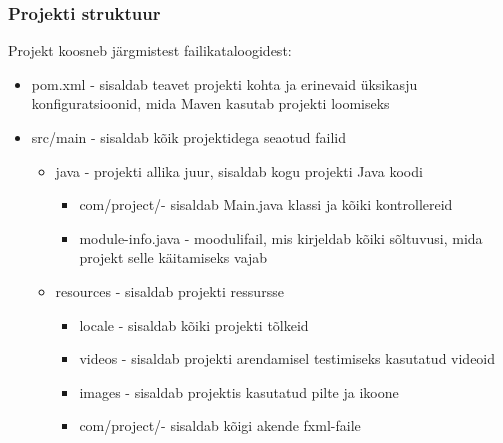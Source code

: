 \subsubsection{Projekti struktuur}
Projekt koosneb järgmistest failikataloogidest: 
\begin{itemize}
\item     pom.xml - sisaldab teavet projekti kohta ja erinevaid üksikasju konfiguratsioonid, mida Maven kasutab projekti loomiseks
    \item src/main - sisaldab kõik projektidega seaotud failid
    \begin{itemize}
        \item java - projekti allika juur, sisaldab kogu projekti Java koodi
        \begin{itemize}
            \item com/project/\projectFolder  - sisaldab Main.java klassi ja kõiki kontrollereid
            \item module-info.java - moodulifail, mis kirjeldab kõiki sõltuvusi, mida projekt selle käitamiseks vajab
        \end{itemize}
        \item         resources - sisaldab projekti ressursse
        \begin{itemize}
        \item locale - sisaldab kõiki projekti tõlkeid
            \item videos - sisaldab projekti arendamisel testimiseks kasutatud videoid
            \item images - sisaldab projektis kasutatud pilte ja ikoone
            \item com/project/\projectFolder - sisaldab kõigi akende fxml-faile
        \end{itemize}
    \end{itemize}
\end{itemize}